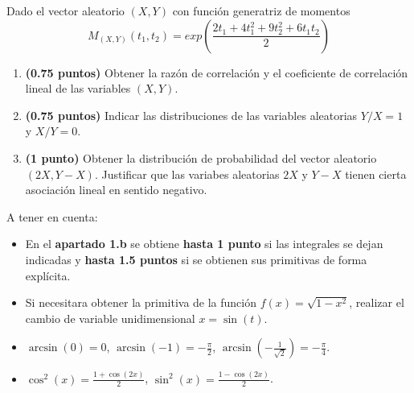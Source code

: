 \documentclass[12pt]{article}
\begin{document}
    \begin{ejercicio}[2.5 puntos]
        Dado el vector aleatorio $(X,Y)$ con función generatriz de momentos
        \begin{equation*}
            M_{(X,Y)}(t_1,t_2) = exp\left(\dfrac{2t_1 + 4t_1^2 + 9t_2^2 + 6t_1t_2}{2}\right)
        \end{equation*}
        \begin{enumerate}[label=\alph*)]
            \item \textbf{(0.75 puntos)} Obtener la razón de correlación y el coeficiente de correlación lineal de las variables $(X,Y)$.
            \item \textbf{(0.75 puntos)} Indicar las distribuciones de las variables aleatorias $Y/X = 1$ y $X/Y=0$.
            \item \textbf{(1 punto)} Obtener la distribución de probabilidad del vector aleatorio $(2X, Y-X)$. Justificar que las variabes aleatorias $2X$ y $Y-X$ tienen cierta asociación lineal en sentido negativo.
        \end{enumerate}
    \end{ejercicio}

    \begin{observacion}
        A tener en cuenta:
        \begin{itemize}
            \item En el \textbf{apartado 1.b} se obtiene \textbf{hasta 1 punto} si las integrales se dejan indicadas y \textbf{hasta 1.5 puntos} si se obtienen sus primitivas de forma explícita.
            \item Si necesitara obtener la primitiva de la función $f(x) = \sqrt{1-x^2}$, realizar el cambio de variable unidimensional $x=\sin(t)$.
            \item $\arcsin(0)=0$, $\arcsin(-1)=-\frac{\pi}{2}$, $\arcsin\left(-\frac{1}{\sqrt{2}}\right) = -\frac{\pi}{4}$.
            \item $\cos^2(x) = \frac{1+\cos(2x)}{2}$, $\sin^2(x) = \frac{1-\cos(2x)}{2}$.
        \end{itemize}
    \end{observacion}
\end{document}
